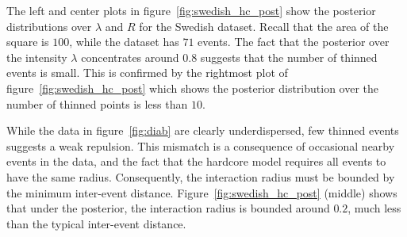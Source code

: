 \documentclass{statsoc}
\begin{document}
The left and center plots in figure~\ref{fig:swedish_hc_post} show the posterior distributions over $\lambda$ and $R$ %
for the Swedish dataset.
Recall that the area of the square is $100$, while the dataset has $71$ \matern events.
The fact that the posterior over the intensity $\lambda$ concentrates around 
$0.8$ suggests that the number of thinned events is small. This is confirmed by the rightmost plot 
of figure~\ref{fig:swedish_hc_post} which shows the posterior distribution over the number of thinned  points is less than $10$.
\begin{table}
  \caption{\label{tab:ess_mat_hc}Effective sample sizes (per 1000 samples) for the \matern type-III process } %
\centering
\end{table}
While the data in figure~\ref{fig:diab} are clearly underdispersed, few thinned events suggests a weak repulsion.
This mismatch is a consequence of occasional nearby events in the data, and the fact that the hardcore model requires
all events to have the same radius. Consequently, the interaction radius must be bounded by the minimum inter-event distance.
 Figure~\ref{fig:swedish_hc_post} (middle) shows that under the posterior, the interaction radius is bounded around $0.2$, much less than
 the typical inter-event distance.
\end{document}
